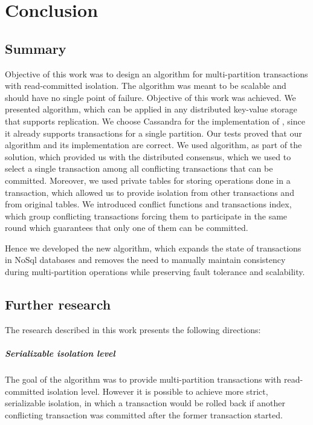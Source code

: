 
\chapter{Conclusion}\label{chapter:summary}

\section{Summary}
Objective of this work was to design an algorithm for multi-partition transactions with read-committed isolation. The algorithm was meant to be scalable and should have no single point of failure. Objective of this work was achieved. We presented \mpt algorithm, which can be applied in any distributed key-value storage that supports replication.
We choose Cassandra for the implementation of \mpt, since it already supports transactions for a single partition. Our tests proved that our algorithm and its implementation are correct. We used \paxos algorithm, as part of the solution, which provided us with the distributed consensus, which we used to select a single transaction among all conflicting transactions that can be committed. Moreover, we used private tables for storing operations done in a  transaction, which allowed us to provide isolation from other transactions and from original tables. We introduced conflict functions and transactions index, which group conflicting transactions forcing them to participate in the same \paxos round which guarantees that only one of them can be committed.

Hence we developed the new algorithm, which expands the state of transactions in NoSql databases and 
removes the need to manually maintain consistency during multi-partition operations 
while preserving fault tolerance and scalability. 


\section{Further research}
The research described in this work presents the following directions:

\paragraph{Serializable isolation level}
The goal of the algorithm was to provide multi-partition transactions with read-committed isolation level. However it is possible to achieve more strict, serializable isolation, in which a transaction would be rolled back if another conflicting transaction was committed after the former transaction started. 

